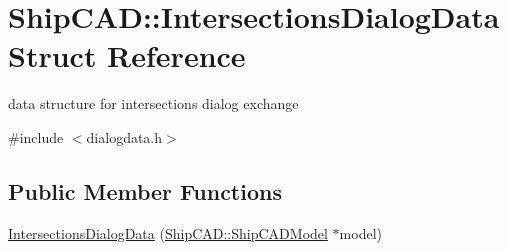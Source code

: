 \hypertarget{structShipCAD_1_1IntersectionsDialogData}{}\section{Ship\+C\+AD\+:\+:Intersections\+Dialog\+Data Struct Reference}
\label{structShipCAD_1_1IntersectionsDialogData}


data structure for intersections dialog exchange  




{\ttfamily \#include $<$dialogdata.\+h$>$}

\subsection*{Public Member Functions}
\begin{DoxyCompactItemize}
\item 
\hyperlink{structShipCAD_1_1IntersectionsDialogData_a7590ecffa4f48488a42135b41ad6eb51}{Intersections\+Dialog\+Data} (\hyperlink{classShipCAD_1_1ShipCADModel}{Ship\+C\+A\+D\+::\+Ship\+C\+A\+D\+Model} $\ast$model)
\end{DoxyCompactItemize}
